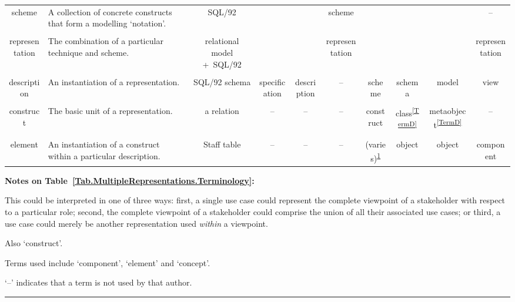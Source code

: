 \documentclass[10pt]{llncs}
\newcommand{\tabnote}[1]{\textrm{\textsuperscript{#1}}}
\newcounter{tnote}
\renewcommand{\thetnote}{\alph{tnote}}
\newenvironment{tabnotes}[1]%
	{	\vspace{\baselineskip}
		\begin{minipage}{0.95\columnwidth}
			\textbf{#1}
			\begin{list}{\thetnote}%
			{	\setlength{\topsep}{0pt}
				\setlength{\itemsep}{0pt}
				\setlength{\parsep}{0pt}
				\usecounter{tnote}
				\renewcommand{\makelabel}[1]{\hfil{\textsuperscript{##1}}}
			}
	}%
	{		\end{list}
		\end{minipage}
	}
\begin{document}
\begin{sidewaystable}[p]
\begin{tabular}{cp{3.5cm}cccccccc}
		\\
		scheme					&	A collection of concrete constructs that form a modelling `notation'.								&	SQL/92													&													&												&	scheme											&												&																&																	&	--	\\
		\\
		representation			&	The combination of a particular technique and scheme.												&	\parbox[t]{\wEG}{\centering relational model +~SQL/92}	&													&												&	\parbox[t]{\wDnS}{\centering represen\-tation}	&												&																&																	&	\parbox[t]{\wGrun}{\centering represen\-tation}	\\
		\\
		description				&	An instantiation of a representation.																&	SQL/92 schema											&	\parbox[t]{\wFink}{\centering specifi\-cation}	&	description									&	--												&	scheme										&	schema														&	model															&	view	\\
		\\
		construct				&	The basic unit of a representation.																	&	a relation												&	--												&	--											&	--												&	construct									&	class\tabnote{\ref{TermD}}									&	metaobject\tabnote{\ref{TermD}}									&	--	\\
		\\
		element					&	An instantiation of a construct within a particular description.									&	\textsf{Staff} table									&	--												&	--											&	--												&	(varies)\tabnote{\ref{TermA}}				&	object														&	object															&	component	\\
	\end{tabular}

	\begin{tabnotes}{Notes on Table~\ref{Tab.MultipleRepresentations.Terminology}:}
		\item\label{TermB} This could be interpreted in one of three ways: first, a single use case could represent the complete viewpoint of a stakeholder with respect to a particular role; second, the complete viewpoint of a stakeholder could comprise the union of all their associated use cases; or third, a use case could merely be another representation used \emph{within} a viewpoint.
		\item\label{TermD} Also `construct'.
		\item\label{TermA} Terms used include `component', `element' and `concept'.
		\item[]	`--' indicates that a term is not used by that author.
	\end{tabnotes}
	\smallskip\hrule
\end{sidewaystable}
\end{document}
